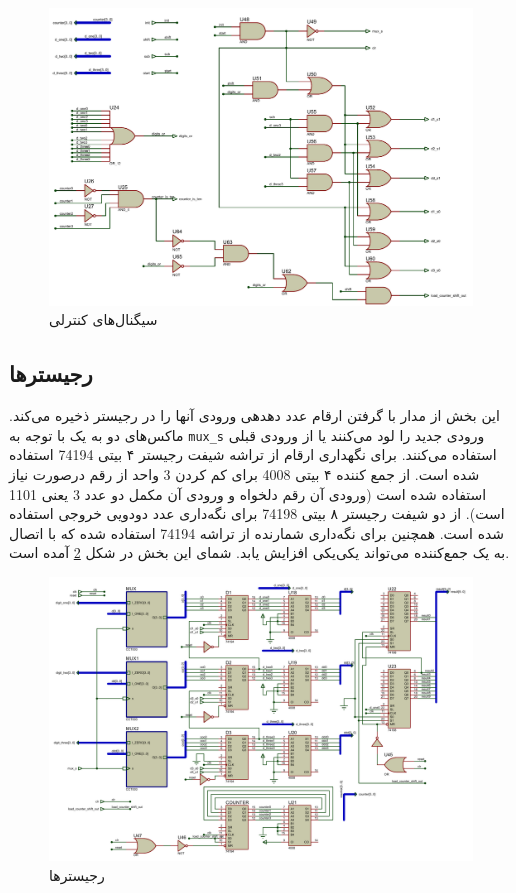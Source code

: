 \documentclass{article}
\begin{document}
\begin{figure}
	\centering
	\includegraphics[scale=0.4]{./graphics/ControlSignals}
	\caption{سیگنال‌های کنترلی}
	\label{fig:cs}
\end{figure}

\subsection{رجیسترها}
این بخش از مدار با گرفتن ارقام عدد دهدهی ورودی آنها را در رجیستر ذخیره می‌کند. ماکس‌های دو به یک با توجه به \verb!mux_s! ورودی جدید را لود می‌کنند یا از ورودی قبلی استفاده می‌کنند. برای نگهداری ارقام از تراشه شیفت رجیستر ۴ بیتی 74194 استفاده شده است. از جمع کننده ۴ بیتی 4008 برای کم کردن 3 واحد از رقم درصورت نیاز استفاده شده است (ورودی  آن رقم دلخواه و ورودی  آن مکمل دو عدد 3 یعنی 1101 است). از دو شیفت رجیستر ۸ بیتی 74198 برای نگه‌داری عدد دودویی خروجی استفاده شده است. همچنین برای نگه‌داری شمارنده از تراشه 74194 استفاده شده که با اتصال به یک جمع‌کننده می‌تواند یکی‌یکی افزایش یابد.
شمای این بخش در شکل \ref{fig:reg} آمده است.

\begin{figure}
	\centering
	\includegraphics[scale=0.4]{./graphics/registers}
	\caption{رجیسترها}
	\label{fig:reg}
\end{figure}
\end{document}
